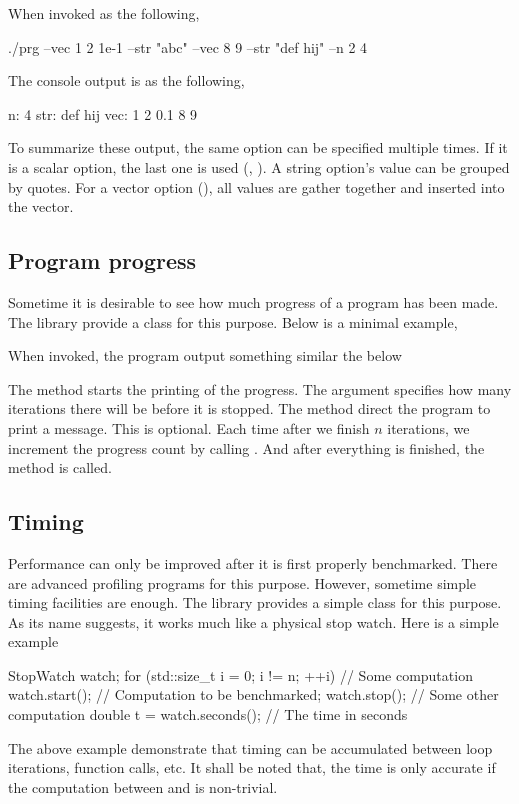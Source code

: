 When invoked as the following,
\begin{consolecode}
  ./prg --vec 1 2 1e-1 --str "abc" --vec 8 9 --str "def hij" --n 2 4
\end{consolecode}
The console output is as the following,
\begin{consolecode}
  n: 4
  str: def hij
  vec: 1 2 0.1 8 9
\end{consolecode}
To summarize these output, the same option can be specified multiple times. If
it is a scalar option, the last one is used (, ).
A string option's value can be grouped by quotes. For a vector option
(), all values are gather together and inserted into the
vector.

\subsection{Program progress}
\label{sub:Program progress}

Sometime it is desirable to see how much progress of a program has been made.
The library provide a  class for this purpose. Below is a
minimal example,
\begin{cppcode}
\end{cppcode}

When invoked, the program output something similar the below
The method  starts the printing of the
progress. The argument specifies how many iterations there will be before it is
stopped. The method  direct the program
to print a message. This is optional. Each time after we finish $n$ iterations,
we increment the progress count by calling .
And after everything is finished, the method  is
called.

\subsection{Timing}
\label{sub:Timing}

Performance can only be improved after it is first properly benchmarked. There
are advanced profiling programs for this purpose. However, sometime simple
timing facilities are enough. The library provides a simple class
 for this purpose. As its name suggests, it works much
like a physical stop watch. Here is a simple example
\begin{cppcode}
  StopWatch watch;
  for (std::size_t i = 0; i != n; ++i) {
    // Some computation
    watch.start();
    // Computation to be benchmarked;
    watch.stop();
    // Some other computation
  }
  double t = watch.seconds(); // The time in seconds
\end{cppcode}
The above example demonstrate that timing can be accumulated between loop
iterations, function calls, etc. It shall be noted that, the time is only
accurate if the computation between  and
 is non-trivial.

\printbibliography[title=\refname]
